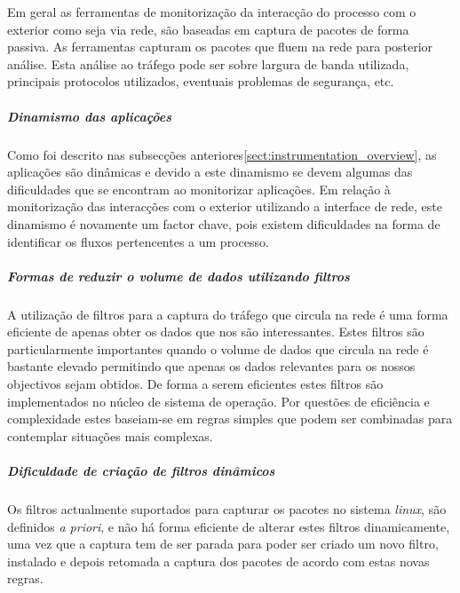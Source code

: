 % 
% 
% 

Em geral as ferramentas de monitorização da interacção do processo com o exterior como seja via rede, são baseadas em captura de pacotes de forma passiva. As ferramentas capturam os pacotes que fluem na rede para posterior análise. Esta análise ao tráfego pode ser sobre largura de banda utilizada, principais protocolos utilizados, eventuais problemas de segurança, etc.

\subparagraph*{Dinamismo das aplicações}
Como foi descrito nas subsecções anteriores\ref{sect:instrumentation_overview}, as aplicações são dinâmicas e devido a este dinamismo se devem algumas das dificuldades que se encontram ao monitorizar aplicações. Em relação à monitorização das interacções com o exterior utilizando a interface de rede, este dinamismo é novamente um factor chave, pois existem dificuldades na forma de identificar os fluxos pertencentes a um processo.

\subparagraph*{Formas de reduzir o volume de dados utilizando filtros}
A utilização de filtros para a captura do tráfego que circula na rede é uma forma eficiente de apenas obter os dados que nos são interessantes. Estes filtros são particularmente importantes quando o volume de dados que circula na rede é bastante elevado permitindo que apenas os dados relevantes para os nossos objectivos sejam obtidos. De forma a serem eficientes estes filtros são implementados no núcleo de sistema de operação. Por questões de eficiência e complexidade estes baseiam-se em regras simples que podem ser combinadas para contemplar situações mais complexas.

\subparagraph*{Dificuldade de criação de filtros dinâmicos}
Os filtros actualmente suportados para capturar os pacotes no sistema \textit{linux}, são definidos \textit{a priori}, e não há forma eficiente de alterar estes filtros dinamicamente, uma vez que a captura tem de ser parada para poder ser criado um novo filtro, instalado e depois retomada a captura dos pacotes de acordo com estas novas regras.

